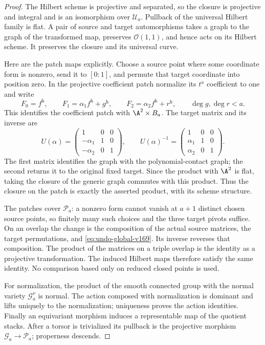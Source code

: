 \documentclass[11pt,reqno]{amsart}
\numberwithin{equation}{section}
\theoremstyle{definition}\newtheorem{definition}[theorem]{Definition}
\theoremstyle{remark}\newtheorem{remark}[theorem]{Remark}
\newcommand{\OO}{\mathcal O}\newcommand{\II}{\mathcal I}
\begin{document}
\begin{proof}
The Hilbert scheme is projective and separated, so the closure is
projective and integral and is an isomorphism over $\mathcal U_a$.
Pullback of the universal Hilbert family is flat. A pair of source and
target automorphisms takes a graph to the graph of the transformed
map, preserves $\OO(1,1)$, and hence acts on its Hilbert scheme.
It preserves the closure and its universal curve.

Here are the patch maps explicitly. Choose a source point where some
coordinate form is nonzero, send it to $[0:1]$, and permute that target
coordinate into position zero. In the projective coefficient patch
normalize its $t^a$ coefficient to one and write
\[
 F_0=f^{\mathrm h},\qquad
 F_1=\alpha_1 f^{\mathrm h}+g^{\mathrm h},\qquad
 F_2=\alpha_2 f^{\mathrm h}+r^{\mathrm h},
 \qquad\deg g,\deg r<a.
\]
This identifies the coefficient patch with $\A^2\times B_a$.
The target matrix and its inverse are
\begin{equation}\label{eq:undo-global-v169}
 U(\alpha)=
 \begin{pmatrix}1&0&0\\-\alpha_1&1&0\\-\alpha_2&0&1\end{pmatrix},
 \qquad
 U(\alpha)^{-1}=
 \begin{pmatrix}1&0&0\\\alpha_1&1&0\\\alpha_2&0&1\end{pmatrix}.
\end{equation}
The first matrix identifies the graph with the polynomial-contact
graph; the second returns it to the original fixed target. Since the
product with $\A^2$ is flat, taking the closure of the generic graph
commutes with this product. Thus the closure on the patch is exactly
the asserted product, with its scheme structure.

The patches cover $\mathcal P_a$: a nonzero form cannot vanish at
$a+1$ distinct chosen source points, so finitely many such choices
and the three target pivots suffice. On an overlap the change is the
composition of the actual source matrices, the target permutations,
and \eqref{eq:undo-global-v169}. Its inverse reverses that composition.
The product of the matrices on a triple overlap is the identity as a
projective transformation. The induced Hilbert maps therefore satisfy
the same identity. No comparison based only on reduced closed points
is used.

For normalization, the product of the smooth connected group with
the normal variety $\mathcal G_a^\nu$ is normal. The action composed
with normalization is dominant and lifts uniquely to the normalization;
uniqueness proves the action identities. Finally an equivariant
morphism induces a representable map of the quotient stacks. After a
torsor is trivialized its pullback is the projective morphism
$\mathcal G_a\to\mathcal P_a$; properness descends.
\end{proof}
\end{document}
